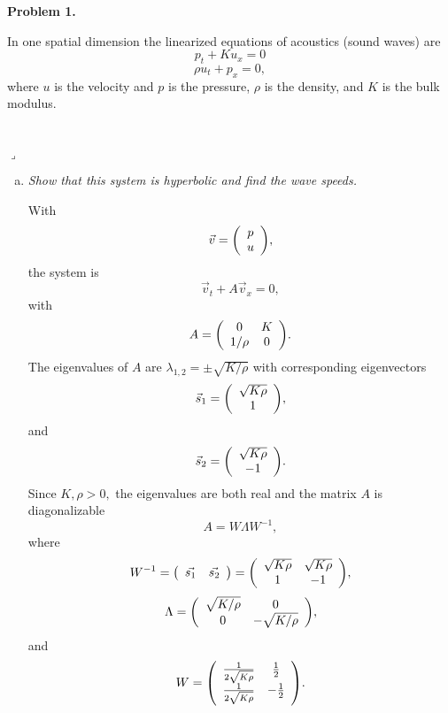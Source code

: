 \documentclass[12pt]{article}
\newenvironment{myprob}[1]
    {%
    \noindent{\Huge$\ulcorner$}\textbf{#1.}\begin{em}
    }
    { 
    \end{em} \\ \hphantom{l} \hfill {\Huge$\lrcorner$} }
\begin{document}
\rhead{\today}

{\let\newpage\relax} 


\begin{myprob}{Problem 1}
In one spatial dimension the linearized equations of acoustics (sound waves) are
$$p_t + K u_x = 0 $$
$$\rho u_t + p_x =0,$$
where $u$ is the velocity and $p$ is the pressure, $\rho$ is the density, and $K$ is the bulk modulus.
\end{myprob}
\begin{enumerate}[(a)]
\item \emph{Show that this system is hyperbolic and find the wave speeds.}

With $$\vec{v} = \qty(\begin{array}{c} p \\ u \end{array}),$$
the system is $$\vec{v}_t + A\vec{v}_x = 0,$$
with $$A = \qty(\begin{array}{cc} 0 & K \\ 1/\rho & 0 \end{array}).$$
The eigenvalues of $A$ are $\lambda_{1,2}=\pm \sqrt{K/\rho}$ with corresponding eigenvectors $$\vec{s}_1 = \qty(\begin{array}{c} \sqrt{K\rho} \\ 1 \end{array}),$$
and $$\vec{s}_2 = \qty(\begin{array}{c} \sqrt{K\rho} \\ -1 \end{array}).$$
Since $K, \rho >0,$ the eigenvalues are both real and the matrix $A$ is diagonalizable
$$ A = W\Lambda W^{-1},$$
where $$W^{-1} = \qty(\begin{array}{cc} \vec{s_1} & \vec{s_2} \end{array}) = \qty(\begin{array}{cc} \sqrt{K\rho} & \sqrt{K\rho} \\ 1 & -1 \end{array}),$$
$$ \Lambda = \qty(\begin{array}{cc} \sqrt{K/\rho} & 0 \\ 0 & -\sqrt{K/\rho} \end{array}),$$
and $$ W = \qty(\begin{array}{cc} \frac{1}{2\sqrt{K\rho}} & \frac{1}{2} \\ \frac{1}{2\sqrt{K\rho}} & -\frac{1}{2} \end{array}).$$

\end{enumerate}
\end{document}
